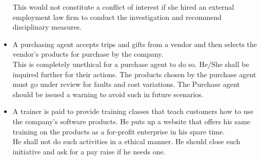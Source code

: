 \documentclass[12pt,a4paper,oneside]{article}
\begin{document}
\begin{itemize}
    This would not constitute a conflict of interest if she hired an external employment law firm to conduct the investigation and recommend disciplinary measures.
\item A purchasing agent accepts trips and gifts from a vendor and then selects the vendor's products for purchase by the company.\\
    This is completely unethical for a purchase agent to do so. He/She shall be inquired further for their actions. The products chosen by the purchase agent must go under review for faults and cost variations. The Purchase agent should be issued a warning to avoid such in future scenarios.  
\item A trainer is paid to provide training classes that teach customers how to use the company's software products. He puts up a website that offers his same training on the products as a for-profit enterprise in his spare time. \\
    He shall not do such activities in a ethical manner. He should close such initiative and ask for a pay raise if he needs one. 
\end{itemize}

\clearpage
\end{document}
